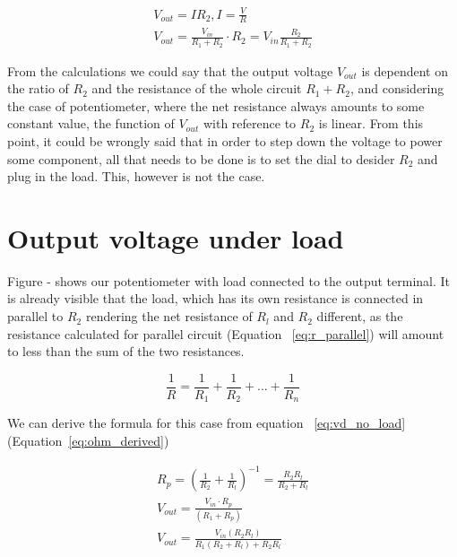\documentclass{article}
\begin{document}
    \begin{align}
        V_{out} = IR_2, I = \frac{V}{R} \\
        V_{out} = \frac{V_{in}}{R_1 + R_2} \cdot R_2 = V_{in}\frac{R_2}{R_1 + R_2}%
            \label{eq:vd_no_load}
    \end{align}

    From the calculations we could say that the output voltage $V_{out}$ is 
    dependent on the ratio of $R_2$ and the resistance of the whole circuit
    $R_1 + R_2$, and considering the case of potentiometer, where the net
    resistance always amounts to some constant value, the function of $V_{out}$
    with reference to $R_2$ is linear. From this point, it could be wrongly 
    said that in order to step down the voltage to power some component, all
    that needs to be done is to set the dial to desider $R_2$ and plug in 
    the load. This, however is not the case.

\section{Output voltage under load}

    Figure - shows our potentiometer with load connected to the output terminal.
    It is already visible that the load, which has its own resistance is connected
    in parallel to $R_2$ rendering the net resistance of $R_l$ and $R_2$ different, 
    as the resistance calculated for parallel circuit (Equation
    ~\eqref{eq:r_parallel}) will amount to less than the sum of the two 
    resistances. 
    
    \begin{equation}\label{parallel_circuit_R}
        \frac{1}{R} = \frac{1}{R_1} + \frac{1}{R_2} + ... + \frac{1}{R_n} %
            \label{eq:r_parallel}
    \end{equation}
    
    We can derive the formula for this case from equation ~\eqref{eq:vd_no_load} 
    (Equation~\ref{eq:ohm_derived})
    
    \begin{align}
        R_p = (\frac{1}{R_2} + \frac{1}{R_l})^{-1} = \frac{R_2R_l}{R_2 + R_l} \\
        V_{out} = \frac{V_{in} \cdot R_p}{(R_1 + R_p)} \\
        V_{out} = \frac{V_{in}(R_2R_l)}{R_1(R_2 + R_l) + R_2R_l}%
            \label{eq:ohm_derived}
    \end{align}
\end{document}
